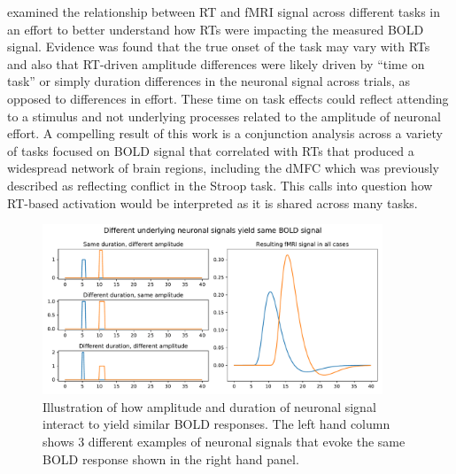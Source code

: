 \documentclass[titlepage,12pt] {article}
\begin{document}
\citet{yarkoni_bold_2009} examined the relationship between RT and fMRI signal across different tasks in an effort to better understand how RTs were impacting the measured BOLD signal.  Evidence was found that the true onset of the task may vary with RTs and also that RT-driven amplitude differences were likely driven by ``time on task'' or simply duration differences in the neuronal signal across trials, as opposed to differences in effort.  These time on task effects could reflect attending to a stimulus and not underlying processes related to the amplitude of neuronal effort.  A compelling result of this work is a conjunction analysis across a variety of tasks focused on BOLD signal that correlated with RTs that produced a widespread network of brain regions, including the dMFC which was previously described as reflecting conflict in the Stroop task.  This calls into  question how RT-based activation would be interpreted as it is shared across many tasks.  

 \begin{figure}[h!]
  \centering
   \includegraphics[width=4in]{Figures/neuron_same_bold.pdf}
   \caption{Illustration of how amplitude and duration of neuronal signal interact to yield similar BOLD responses.  The left hand column shows 3 different examples of neuronal signals that evoke the same BOLD response shown in the right hand panel.   }
  \label{fig:neuron_bold}
 \end{figure}
\end{document}
